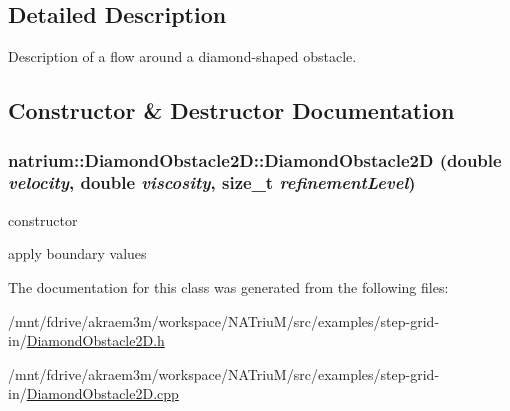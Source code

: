 \subsection{Detailed Description}
Description of a flow around a diamond-\/shaped obstacle. 

\subsection{Constructor \& Destructor Documentation}
\hypertarget{classnatrium_1_1DiamondObstacle2D_a466c22e26de373b06ccba9c5e0a23c33}{
\subsubsection[{DiamondObstacle2D}]{\setlength{\rightskip}{0pt plus 5cm}natrium::DiamondObstacle2D::DiamondObstacle2D (double {\em velocity}, \/  double {\em viscosity}, \/  size\_\-t {\em refinementLevel})}}
\label{classnatrium_1_1DiamondObstacle2D_a466c22e26de373b06ccba9c5e0a23c33}


constructor 

apply boundary values 

The documentation for this class was generated from the following files:\begin{DoxyCompactItemize}
\item 
/mnt/fdrive/akraem3m/workspace/NATriuM/src/examples/step-\/grid-\/in/\hyperlink{DiamondObstacle2D_8h}{DiamondObstacle2D.h}\item 
/mnt/fdrive/akraem3m/workspace/NATriuM/src/examples/step-\/grid-\/in/\hyperlink{DiamondObstacle2D_8cpp}{DiamondObstacle2D.cpp}\end{DoxyCompactItemize}
